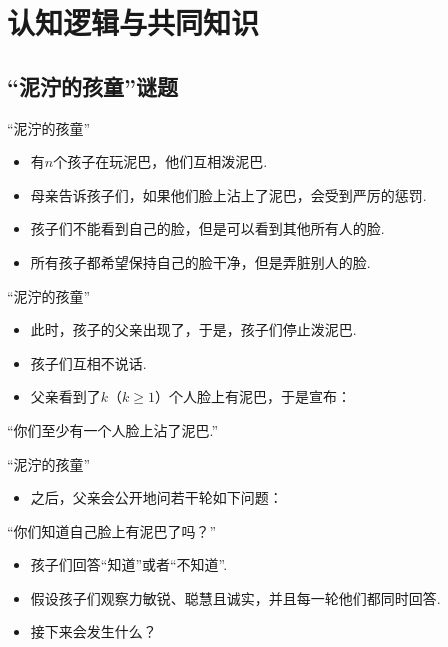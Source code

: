 \chapter{认知逻辑与共同知识}\label{chap:epistemic-logic}

\section{“泥泞的孩童”谜题}
\begin{frame}{“泥泞的孩童”}
\begin{itemize}
    \item 有$n$个孩子在玩泥巴，他们互相泼泥巴.
    \item 母亲告诉孩子们，如果他们脸上沾上了泥巴，会受到严厉的惩罚.
    \item 孩子们不能看到自己的脸，但是可以看到其他所有人的脸.
    \item 所有孩子都希望保持自己的脸干净，但是弄脏别人的脸.
\end{itemize}
\end{frame}
\begin{frame}{“泥泞的孩童”}
\begin{itemize}
    \item 此时，孩子的父亲出现了，于是，孩子们停止泼泥巴.
    \item 孩子们互相不说话.
    \item 父亲看到了$k$（$k\geq 1$）个人脸上有泥巴，于是宣布：
\end{itemize}
    \begin{center}
        “你们至少有一个人脸上沾了泥巴.”
    \end{center}
\end{frame}

\begin{frame}{“泥泞的孩童”}
\begin{itemize}
    \item 之后，父亲会公开地问若干轮如下问题：
\end{itemize}
\begin{center}
    “你们知道自己脸上有泥巴了吗？”
\end{center}
\begin{itemize}
    \item 孩子们回答“知道”或者“不知道”.
    \item 假设孩子们观察力敏锐、聪慧且诚实，并且每一轮他们都同时回答.
    \item 接下来会发生什么？
\end{itemize}
\end{frame}

